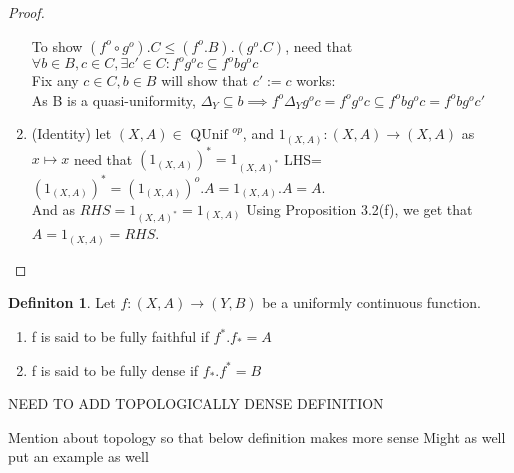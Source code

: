 \documentclass[18pt,a4paper]{article}
\theoremstyle{definition}
\newtheorem{definition}[theorem]{Definiton}
\begin{document}
\begin{proof}
\begin{enumerate}[label=(\roman*)]
					To show $(f^o \circ g^o).C\leq(f^o .B).(g^o .C)$, need that
					$\forall b \in B, c \in C, \exists c' \in C: f^o g^o c \subseteq f^obg^oc $
					\\Fix any $c\in C, b\in B$ will show that $c':=c$ works:\\
					As B is a quasi-uniformity, $\Delta_Y \subseteq b\implies f^o \Delta_Y
					g^o c=f^o g^o c \subseteq f^o b	g^o c=f^o b g^o c'$
				\item(Identity) let $(X,A)\in \text{ QUnif }^{op} $, and
					$1_{(X,A)}:(X,A)\to(X,A)$ as $x\mapsto x$ need that
					$(1_{(X,A)})^*=1_{(X,A)^*}$
					LHS=$(1_{(X,A)})^*=(1_{(X,A)})^o.A=1_{(X,A)}.A=A$. \\
					And as $RHS=1_{(X,A)^*}=1_{(X,A)}$
					Using Proposition 3.2(f), we get that $A=1_{(X,A)}=RHS$. \qedhere
			\end{enumerate}
		\end{proof}
		\begin{definition} %
			Let $f:(X,A) \to (Y,B)$ be a uniformly continuous function.
			\begin{enumerate}[label=\Roman*]
				\item f is said to be fully faithful if	$f^* .f_*=A $
				\item f is said to be fully dense if $f_* .f^*=B $
			\end{enumerate}
		\end{definition}

		NEED TO ADD TOPOLOGICALLY DENSE DEFINITION

		Mention about topology so that below definition makes more sense
		Might as well put an example as well
\end{document}

